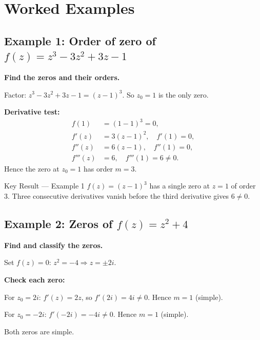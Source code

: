 \documentclass[12pt,a4paper]{article}
\begin{document}
\section{Worked Examples}

\subsection*{Example 1: Order of zero of $f(z) = z^3 - 3z^2 + 3z - 1$}

\textbf{Find the zeros and their orders.}

Factor: $z^3 - 3z^2 + 3z - 1 = (z-1)^3$. So $z_0 = 1$ is the only zero.

\medskip\noindent\textbf{Derivative test:}
\begin{align*}
  f(1)   &= (1-1)^3 = 0,\\
  f'(z)  &= 3(z-1)^2,\quad f'(1)=0,\\
  f''(z) &= 6(z-1),\quad f''(1)=0,\\
  f'''(z)&= 6,\quad f'''(1)=6\neq 0.
\end{align*}
Hence the zero at $z_0 = 1$ has order $m = 3$.

\begin{learnbox}{Key Result --- Example 1}
$f(z)=(z-1)^3$ has a single zero at $z=1$ of order 3. Three consecutive derivatives
vanish before the third derivative gives $6\neq 0$.
\end{learnbox}

\subsection*{Example 2: Zeros of $f(z) = z^2 + 4$}

\textbf{Find and classify the zeros.}

Set $f(z)=0$: $z^2 = -4 \Rightarrow z = \pm 2i$.

\medskip\noindent\textbf{Check each zero:}

For $z_0 = 2i$: $f'(z)=2z$, so $f'(2i)=4i\neq 0$. Hence $m=1$ (simple).

For $z_0 = -2i$: $f'(-2i)=-4i\neq 0$. Hence $m=1$ (simple).

Both zeros are simple.
\end{document}
